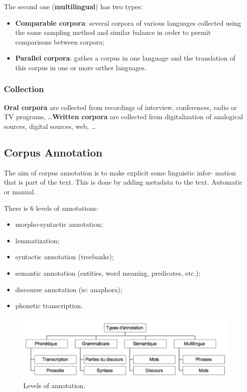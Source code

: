 The second one (\textbf{multilingual}) has two types:
\begin{itemize}
	\item \textbf{Comparable corpora}: several corpora of various languages collected using the same sampling method and similar balance in order to permit comparisons between corpora;
	\item \textbf{Parallel corpora}: gather a corpus in one language and the translation of this corpus in one or more orther languages.
\end{itemize}

\subsubsection{Collection}

\textbf{Oral corpora} are collected from recordings of interview, conferences, radio or TV programs, \dots \textbf{Written corpora} are collected from digitalization of analogical sources, digital sources, web, \dots

\subsection{Corpus Annotation}

The aim of corpus annotation is to make explicit some linguistic infor- mation that is part of the text. This is done by adding metadata to the text. Automatic or manual.

There is 6 levels of annotations:
\begin{itemize}
	\item morpho-syntactic annotation;
	\item lemmatization;
	\item syntactic annotation (treebanks);
	\item semantic annotation (entities, word meaning, predicates, etc.);
	\item discourse annotation (ie: anaphora);
	\item phonetic transcription.
\end{itemize}

\begin{figure}[htp]
	\centering
	\includegraphics[scale=0.6]{images/07_levels.png}
 	\caption{Levels of annotation.}
\end{figure}

